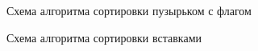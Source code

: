 \documentclass[12pt]{report}
\begin{document}
\newpage
\begin{figure}[h]
\caption{Схема алгоритма сортировки пузырьком с флагом}
\label{ris:imageSB}
\end{figure}

\newpage
\begin{figure}[h]
\caption{Схема алгоритма сортировки вставками}
\label{ris:imageSI}
\end{figure}
\end{document}
